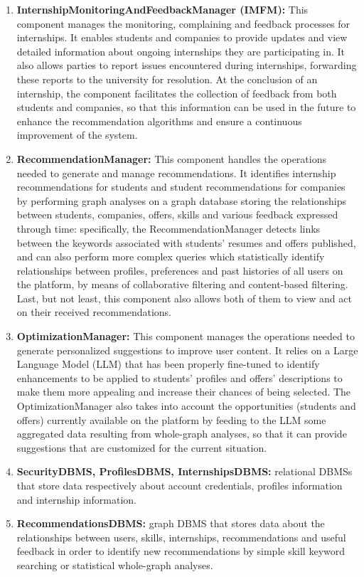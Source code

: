 \begin{enumerate}
    \item \textbf{InternshipMonitoringAndFeedbackManager (IMFM):} This component manages the monitoring, complaining and feedback processes for internships. It enables students and companies to provide updates and view detailed information about ongoing internships they are participating in. It also allows parties to report issues encountered during internships, forwarding these reports to the university for resolution. At the conclusion of an internship, the component facilitates the collection of feedback from both students and companies, so that this information can be used in the future to enhance the recommendation algorithms and ensure a continuous improvement of the system.
    \item \textbf{RecommendationManager:} This component handles the operations needed to generate and manage recommendations. It identifies internship recommendations for students and student recommendations for companies by performing graph analyses on a graph database storing the relationships between students, companies, offers, skills and various feedback expressed through time: specifically, the RecommendationManager detects links between the keywords associated with students' resumes and offers published, and can also perform more complex queries which statistically identify relationships between profiles, preferences and past histories of all users on the platform, by means of collaborative filtering and content-based filtering. Last, but not least, this component also allows both of them to view and act on their received recommendations.
    \item \textbf{OptimizationManager:} This component manages the operations needed to generate personalized suggestions to improve user content. It relies on a Large Language Model (LLM) that has been properly fine-tuned to identify enhancements to be applied to students' profiles and offers' descriptions to make them more appealing and increase their chances of being selected. The OptimizationManager also takes into account the opportunities (students and offers) currently available on the platform by feeding to the LLM some aggregated data resulting from whole-graph analyses, so that it can provide suggestions that are customized for the current situation.
    \item \textbf{SecurityDBMS, ProfilesDBMS, InternshipsDBMS:} relational DBMSs that store data respectively about account credentials, profiles information and internship information.
    \item \textbf{RecommendationsDBMS:} graph DBMS that stores data about the relationships between users, skills, internships, recommendations and useful feedback in order to identify new recommendations by simple skill keyword searching or statistical whole-graph analyses.
\end{enumerate}

